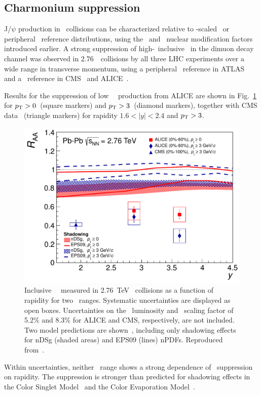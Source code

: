 \subsection{Charmonium suppression}

J/$\psi$ production in \PbPb\ collisions can be characterized relative to \Ncoll-scaled \pp\ or 
peripheral \PbPb\ reference
distributions, using the \Raa\ and \Rcp\ nuclear modification factors introduced earlier.
A strong suppression of high-\pT\ inclusive \jpsi\ in the dimuon decay channel 
was observed in 2.76\TeV\ \PbPb\ collisions by all three LHC experiments over a wide 
range in transverse momentum, using a peripheral \PbPb\ reference in ATLAS~\cite{Aad:2010aa} 
and a \pp\ reference in CMS~\cite{Chatrchyan:2012np} and ALICE~\cite{Abelev:2012rv}.

Results for the suppression of low \pT\ \jpsi\ production from ALICE are shown
in Fig.~\ref{fig:GR:raavsy} for $\mbox{$p_{\mathrm{T}}$} > 0$\GeVc\ (square markers) and
$\mbox{$p_{\mathrm{T}}$} > 3$\GeVc\ (diamond markers), together with CMS data~\cite{Chatrchyan:2012np} (triangle markers)
for rapidity $ 1.6 < |y| < 2.4 $ and $\mbox{$p_{\mathrm{T}}$} > 3$\GeVc.

\begin{figure}
\begin{center}
\includegraphics[width=0.49\linewidth]{qqbarfigures/RAAvsY_v7-eps-converted-to.pdf}
\caption{ \label{fig:GR:raavsy}  Inclusive \jpsi\ \Raa\ measured in 2.76~TeV \PbPb\
collisions as a function of  rapidity for two \pT\ ranges.
Systematic uncertainties are displayed as open boxes. 
Uncertainties on the \pp\ luminosity and \Taa\ scaling factor of
5.2\% and  8.3\% for ALICE and CMS, respectively, are not included.
Two model predictions are shown~\cite{Ferreiro:2011rw,Vogt:2010aa}, including only shadowing effects
for  nDSg (shaded areas) and EPS09 (lines) nPDFs. Reproduced from~\cite{Abelev:2012rv}.}
\end{center}
\end{figure}

Within uncertainties, neither \pT\ range shows a strong dependence of \jpsi\ suppression on rapidity.
The suppression is stronger than predicted for shadowing effects in the Color Singlet
Model~\cite{Ferreiro:2011rw} and the Color Evaporation Model~\cite{Vogt:2010aa}. 

